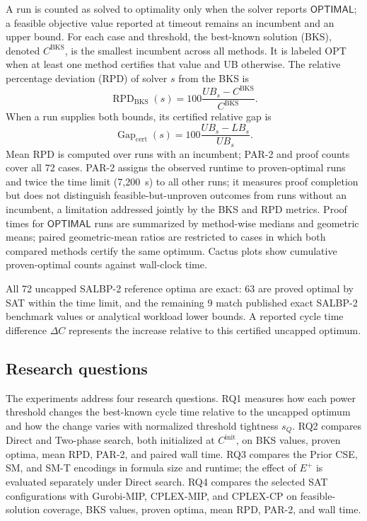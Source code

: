 \documentclass[]{interact}
\theoremstyle{plain}
\theoremstyle{definition}
\theoremstyle{remark}
\newcommand{\Cinit}{C^{\mathrm{init}}}
\newcommand{\Status}[1]{\ensuremath{\mathsf{#1}}}
\begin{document}
A run is counted as solved to optimality only when the solver reports \Status{OPTIMAL}; a feasible objective value reported at timeout remains an incumbent and an upper bound. For each case and threshold, the best-known solution (BKS), denoted $C^{\mathrm{BKS}}$, is the smallest incumbent across all methods. It is labeled OPT when at least one method certifies that value and UB otherwise. The relative percentage deviation (RPD) of solver $s$ from the BKS is
\begin{equation}
\operatorname{RPD}_{\mathrm{BKS}}(s)=
100\frac{UB_s-C^{\mathrm{BKS}}}{C^{\mathrm{BKS}}}.
\label{eq:rpd-bks}
\end{equation}
When a run supplies both bounds, its certified relative gap is
\begin{equation}
\operatorname{Gap}_{\mathrm{cert}}(s)=
100\frac{UB_s-LB_s}{UB_s}.
\label{eq:cert-gap}
\end{equation}
Mean RPD is computed over runs with an incumbent; PAR-2 and proof counts cover all 72 cases. PAR-2 assigns the observed runtime to proven-optimal runs and twice the time limit (7,200~s) to all other runs; it measures proof completion but does not distinguish feasible-but-unproven outcomes from runs without an incumbent, a limitation addressed jointly by the BKS and RPD metrics. Proof times for \Status{OPTIMAL} runs are summarized by method-wise medians and geometric means; paired geometric-mean ratios are restricted to cases in which both compared methods certify the same optimum. Cactus plots show cumulative proven-optimal counts against wall-clock time.

All 72 uncapped SALBP-2 reference optima are exact: 63 are proved optimal by SAT within the time limit, and the remaining 9 match published exact SALBP-2 benchmark values \citep{SchollBenchmark1993} or analytical workload lower bounds. A reported cycle time difference $\Delta C$ represents the increase relative to this certified uncapped optimum.

\subsection{Research questions}

The experiments address four research questions. RQ1 measures how each power threshold changes the best-known cycle time relative to the uncapped optimum and how the change varies with normalized threshold tightness $s_Q$. RQ2 compares Direct and Two-phase search, both initialized at $\Cinit$, on BKS values, proven optima, mean RPD, PAR-2, and paired wall time. RQ3 compares the Prior CSE, SM, and SM-T encodings in formula size and runtime; the effect of $E^+$ is evaluated separately under Direct search. RQ4 compares the selected SAT configurations with Gurobi-MIP, CPLEX-MIP, and CPLEX-CP on feasible-solution coverage, BKS values, proven optima, mean RPD, PAR-2, and wall time.
\end{document}
